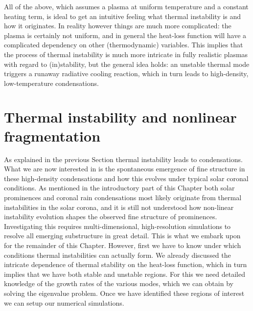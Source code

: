 All of the above, which assumes a plasma at uniform temperature and a constant heating term, is ideal to get an intuitive feeling what thermal instability is and how it originates. In reality however things are much more complicated: the plasma is certainly not uniform, and in general the heat-loss function will have a complicated dependency on other (thermodynamic) variables. This implies that the process of thermal instability is much more intricate in fully realistic plasmas with regard to (in)stability, but the general idea holds: an unstable thermal mode triggers a runaway radiative cooling reaction, which in turn leads to high-density, low-temperature condensations.


\section{Thermal instability and nonlinear fragmentation}
As explained in the previous Section thermal instability leads to condensations. What we are now interested in is the spontaneous emergence of fine structure in these high-density condensations and how this evolves under typical solar coronal conditions. As mentioned in the introductory part of this Chapter both solar prominences and coronal rain condensations most likely originate from thermal instabilities in the solar corona, and it is still not understood how non-linear instability evolution shapes the observed fine structure of prominences. Investigating this requires multi-dimensional, high-resolution simulations to resolve all emerging substructure in great detail. This is what we embark upon for the remainder of this Chapter. However, first we have to know under which conditions thermal instabilities can actually form. We already discussed the intricate dependence of thermal stability on the heat-loss function, which in turn implies that we have both stable and unstable regions. For this we need detailed knowledge of the growth rates of the various modes, which we can obtain by solving the eigenvalue problem. Once we have identified these regions of interest we can setup our numerical simulations.


